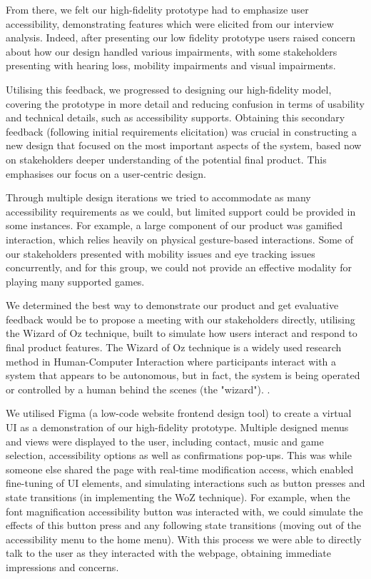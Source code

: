 \documentclass[12pt,a4paper]{article}
\begin{document}
From there, we felt our high-fidelity prototype had to emphasize user accessibility, demonstrating features which were elicited from our interview analysis. Indeed, after presenting our low fidelity prototype users raised concern about how our design handled various impairments, with some stakeholders presenting with hearing loss, mobility impairments and visual impairments. 

Utilising this feedback, we progressed to designing our high-fidelity model, covering the prototype in more detail and reducing confusion in terms of usability and technical details, such as accessibility supports. Obtaining this secondary feedback (following initial requirements elicitation) was crucial in constructing a new design that focused on the most important aspects of the system, based now on stakeholders deeper understanding of the potential final product. This emphasises our focus on a user-centric design. 

Through multiple design iterations we tried to accommodate as many accessibility requirements as we could, but limited support could be provided in some instances. For example, a large component of our product was gamified interaction, which relies heavily on physical gesture-based interactions. Some of our stakeholders presented with mobility issues and eye tracking issues concurrently, and for this group, we could not provide an effective modality for playing many supported games. 

We determined the best way to demonstrate our product and get evaluative feedback would be to propose a meeting with our stakeholders directly, utilising the Wizard of Oz technique, built to simulate how users interact and respond to final product features. The Wizard of Oz technique is a widely used research method in Human-Computer Interaction where participants interact with a system that appears to be autonomous, but in fact, the system is being operated or controlled by a human behind the scenes (the "wizard").  \cite{Paul1985}.

We utilised Figma (a low-code website frontend design tool) to create a virtual UI as a demonstration of our high-fidelity prototype. Multiple designed menus and views were displayed to the user, including contact, music and game selection, accessibility options as well as confirmations pop-ups. This was while someone else shared the page with real-time modification access, which enabled fine-tuning of UI elements, and simulating interactions such as button presses and state transitions (in implementing the WoZ technique). For example, when the font magnification accessibility button was interacted with, we could simulate the effects of this button press and any following state transitions (moving out of the accessibility menu to the home menu). With this process we were able to directly talk to the user as they interacted with the webpage, obtaining immediate impressions and concerns. 
\end{document}

